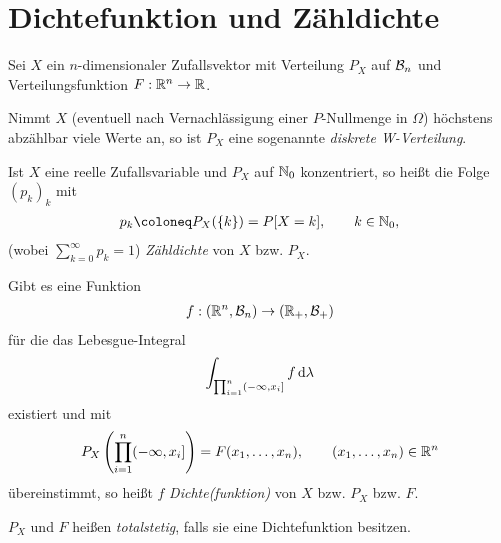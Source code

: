 \section{Dichtefunktion und Zähldichte}

\begin{defn}
\label{defn:4.4}
Sei $X$ ein $n$-dimensionaler Zufallsvektor mit Verteilung
$P_{X}$ auf ${\mathcal{B}}_{n}$ und Verteilungsfunktion $F: \mathbb{R}^{n} \to \mathbb{R}$.
\begin{defnenum}
\item
Nimmt $X$ (eventuell nach Vernachlässigung einer $P$-Nullmenge in $\Omega$)
höchstens abzählbar viele Werte an, so ist $P_{X}$ eine sogenannte
\emph{diskrete W-Verteilung}.

Ist $X$ eine reelle Zufallsvariable und $P_{X}$ auf $\mathbb{N}_{0}$ konzentriert, so
heißt die Folge $(p_{k})_k$ mit
\begin{align*}
p_{k} \defl P_{X}(\setd{k}) = P[X=k],\qquad k \in \N_{0},
\end{align*}
(wobei $\sum_{k=0}^\infty p_{k}=1$) \emph{Zähldichte} von $X$ bzw. $P_{X}$.
\item
Gibt es eine Funktion
\begin{align*}
f: (\mathbb{R}^{n}, {\mathcal{B}}_{n}) \to (\mathbb{R}_{+}, {\mathcal{B}}_{+})
\end{align*}
für die das Lebesgue-Integral
\begin{align*}
\int_{\prod^{n}_{i=1}(-\infty,x_{i}]}f\,\mathrm{d} \lambda 
\end{align*}
existiert und mit
\begin{align*}
P_{X}\left(\prod\limits^{n}_{i=1}(- \infty , x_{i}]\right) = F(x_{1},
\ldots , x_{n}),\qquad (x_{1}, \ldots , x_{n}) \in \mathbb{R}^{n}
\end{align*}
übereinstimmt, so heißt
$f$ \emph{Dichte(funktion)} von $X$ bzw. $P_{X}$ bzw. $F$.

$P_{X}$ und
$F$ heißen \emph{totalstetig}, falls sie eine Dichtefunktion
besitzen.\fishhere
\end{defnenum}
\end{defn}

